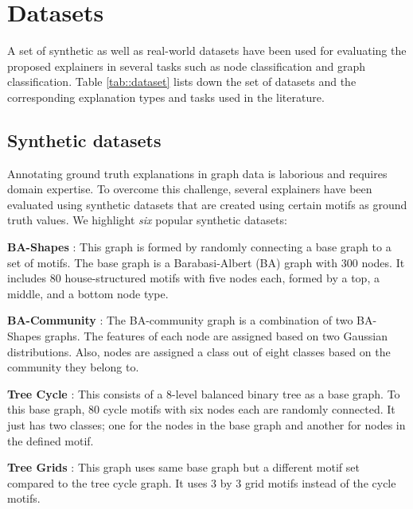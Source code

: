 
\section{Datasets}
\label{sec::datasets}


A set of synthetic as well as real-world datasets have been used for evaluating the proposed explainers in several tasks such as node classification and graph classification. Table \ref{tab::dataset} lists down the set of datasets and the corresponding explanation types and tasks used in the literature.
\subsection{Synthetic datasets}
Annotating ground truth explanations in graph data is laborious and requires domain expertise. To overcome this challenge, several explainers have been evaluated using synthetic datasets that are created using certain motifs as ground truth values. We highlight \textit{six} popular synthetic datasets:%

\noindent\textbf{BA-Shapes} \cite{ying2019gnnexplainer}: This graph is formed by randomly connecting a base graph to a set of motifs. The base graph is a Barabasi-Albert (BA) graph with $300$ nodes. It includes $80$ house-structured motifs with five nodes each, formed by a top, a middle, and a bottom node type. 
    
\noindent\textbf{BA-Community} \cite{ying2019gnnexplainer}: The BA-community graph is a combination of two BA-Shapes graphs. The features of each node are assigned based on two Gaussian distributions. Also, nodes are assigned a class out of eight classes based on the community they belong to.

\noindent\textbf{Tree Cycle} \cite{ying2019gnnexplainer}: This consists of a 8-level balanced binary tree as a base graph. To this base graph, 80 cycle motifs with six nodes each are randomly connected. It just has two classes; one for the nodes in the base graph and another for nodes in the defined motif.
    
\noindent\textbf{Tree Grids} \cite{ying2019gnnexplainer}: This graph uses same base graph but a different motif set compared to the tree cycle graph. It uses 3 by 3 grid motifs instead of the cycle motifs.
    
